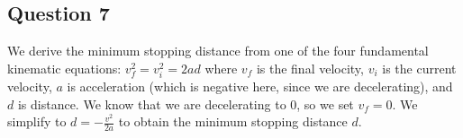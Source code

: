 \subsection*{Question 7}

We derive the minimum stopping distance from one of the four fundamental kinematic equations: $v_f^2 = v_i^2 = 2ad$ where $v_f$ is the final velocity, $v_i$ is the current velocity, $a$ is acceleration (which is negative here, since we are decelerating), and $d$ is distance. We know that we are decelerating to 0, so we set $v_f = 0$. We simplify to $d = -\frac{v^2}{2a}$ to obtain the minimum stopping distance $d$.